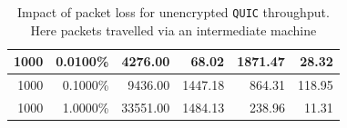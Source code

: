 \documentclass[12pt,a4paper]{report}
\begin{document}
\begin{table}[htbp]
\begin{tabular}{|r|r|r|r|r|r|}
1000                                                                                            & 0.0100\%                                                                                             & 4276.00                                                                                               & 68.02                                                                                                                               & 1871.47                                                                                                                                    & 28.32                                                                                                                             \\ \hline
1000                                                                                            & 0.1000\%                                                                                             & 9436.00                                                                                               & 1447.18                                                                                                                             & 864.31                                                                                                                                     & 118.95                                                                                                                            \\ \hline
1000                                                                                            & 1.0000\%                                                                                             & 33551.00                                                                                              & 1484.13                                                                                                                             & 238.96                                                                                                                                     & 11.31                                                                                                                             \\ \hline
\end{tabular}
 \centering
    \caption[Impact of packet loss for unencrypted \texttt{QUIC} throughput]{Impact of packet loss for unencrypted \texttt{QUIC} throughput. Here packets travelled via an intermediate machine}
    \label{fig:unencrypted_QUIC_throughput_via_B_with_packet_loss}
\end{table}
\end{document}
